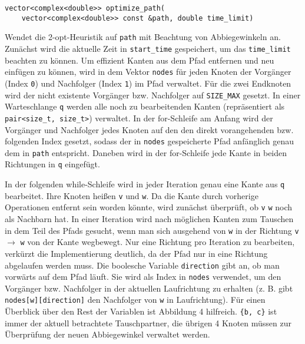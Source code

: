 \documentclass[a4paper, 10pt, ngerman]{article}
\begin{document}
\verb|vector<complex<double>> optimize_path(| \\
\verb|    vector<complex<double>> const &path, double time_limit)|
\medskip

\noindent Wendet die 2-opt-Heuristik auf \verb|path| mit Beachtung von Abbiegewinkeln an. Zunächst wird die aktuelle Zeit in \verb|start_time| gespeichert, um das \verb|time_limit| beachten zu können. Um effizient Kanten aus dem Pfad entfernen und neu einfügen zu können, wird in dem Vektor \verb|nodes| für jeden Knoten der Vorgänger (Index \verb|0|) und Nachfolger (Index \verb|1|) im Pfad verwaltet. Für die zwei Endknoten wird der nicht existente Vorgänger bzw. Nachfolger auf \verb|SIZE_MAX| gesetzt. In einer Warteschlange \verb|q| werden alle noch zu bearbeitenden Kanten (repräsentiert als \verb|pair<size_t, size_t>|) verwaltet. In der for-Schleife am Anfang wird der Vorgänger und Nachfolger jedes Knoten auf den den direkt vorangehenden bzw. folgenden Index gesetzt, sodass der in \verb|nodes| gespeicherte Pfad anfänglich genau dem in \verb|path| entspricht. Daneben wird in der for-Schleife jede Kante in beiden Richtungen in \verb|q| eingefügt.

In der folgenden while-Schleife wird in jeder Iteration genau eine Kante aus \verb|q| bearbeitet. Ihre Knoten heißen \verb|v| und \verb|w|. Da die Kante durch vorherige Operationen entfernt sein worden könnte, wird zunächst überprüft, ob \verb|v| \verb|w| noch als Nachbarn hat. In einer Iteration wird nach möglichen Kanten zum Tauschen in dem Teil des Pfads gesucht, wenn man sich ausgehend von \verb|w| in der Richtung \verb|v| $\rightarrow$ \verb|w| von der Kante wegbewegt. Nur eine Richtung pro Iteration zu bearbeiten, verkürzt die Implementierung deutlich, da der Pfad nur in eine Richtung abgelaufen werden muss. Die boolesche Variable \verb|direction| gibt an, ob man vorwärts auf dem Pfad läuft. Sie wird als Index in \verb|nodes| verwendet, um den Vorgänger bzw. Nachfolger in der aktuellen Laufrichtung zu erhalten (z. B. gibt \verb|nodes[w][direction]| den Nachfolger von \verb|w| in Laufrichtung). Für einen Überblick über den Rest der Variablen ist Abbildung 4 hilfreich. \verb|{b, c}| ist immer der aktuell betrachtete Tauschpartner, die übrigen 4 Knoten müssen zur Überprüfung der neuen Abbiegewinkel verwaltet werden.
\end{document}
